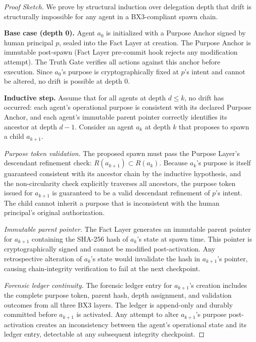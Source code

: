 \begin{proof}[Proof Sketch]
We prove by structural induction over delegation depth that drift is structurally impossible for any agent in a BX3-compliant spawn chain.

\medskip
\noindent\textbf{Base case (depth 0).} Agent $a_0$ is initialized with a Purpose Anchor signed by human principal $p$, sealed into the Fact Layer at creation. The Purpose Anchor is immutable post-spawn (Fact Layer pre-commit hook rejects any modification attempt). The Truth Gate verifies all actions against this anchor before execution. Since $a_0$'s purpose is cryptographically fixed at $p$'s intent and cannot be altered, no drift is possible at depth 0.

\medskip
\noindent\textbf{Inductive step.} Assume that for all agents at depth $d \leq k$, no drift has occurred: each agent's operational purpose is consistent with its declared Purpose Anchor, and each agent's immutable parent pointer correctly identifies its ancestor at depth $d - 1$. Consider an agent $a_k$ at depth $k$ that proposes to spawn a child $a_{k+1}$.

\textit{Purpose token validation.} The proposed spawn must pass the Purpose Layer's descendant refinement check: $R(a_{k+1}) \subset R(a_k)$. Because $a_k$'s purpose is itself guaranteed consistent with its ancestor chain by the inductive hypothesis, and the non-circularity check explicitly traverses all ancestors, the purpose token issued for $a_{k+1}$ is guaranteed to be a valid descendant refinement of $p$'s intent. The child cannot inherit a purpose that is inconsistent with the human principal's original authorization.

\textit{Immutable parent pointer.} The Fact Layer generates an immutable parent pointer for $a_{k+1}$ containing the SHA-256 hash of $a_k$'s state at spawn time. This pointer is cryptographically signed and cannot be modified post-activation. Any retrospective alteration of $a_k$'s state would invalidate the hash in $a_{k+1}$'s pointer, causing chain-integrity verification to fail at the next checkpoint.

\textit{Forensic ledger continuity.} The forensic ledger entry for $a_{k+1}$'s creation includes the complete purpose token, parent hash, depth assignment, and validation outcomes from all three BX3 layers. The ledger is append-only and durably committed before $a_{k+1}$ is activated. Any attempt to alter $a_{k+1}$'s purpose post-activation creates an inconsistency between the agent's operational state and its ledger entry, detectable at any subsequent integrity checkpoint.


\end{proof}
